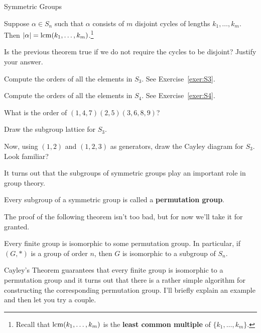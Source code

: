 \begin{section}{Symmetric Groups}
\begin{theorem}
Suppose $\alpha\in S_n$ such that $\alpha$ consists of $m$ disjoint cycles of lengths $k_1,\ldots, k_m$.  Then $|\alpha|=\operatorname{lcm}(k_1,\ldots, k_m)$.\footnote{Recall that $\operatorname{lcm}(k_1,\ldots, k_m)$ is the \textbf{least common multiple} of $\{k_1,\ldots, k_m\}$.} 
\end{theorem}

\begin{problem}
Is the previous theorem true if we do not require the cycles to be disjoint?  Justify your answer.
\end{problem}

\begin{exercise}
Compute the orders of all the elements in $S_3$.  See Exercise~\ref{exer:S3}.
\end{exercise}

\begin{exercise}
Compute the orders of all the elements in $S_4$.  See Exercise~\ref{exer:S4}.
\end{exercise}

\begin{exercise}
What is the order of $(1,4,7)(2,5)(3,6,8,9)$?
\end{exercise}

\begin{exercise}
Draw the subgroup lattice for $S_3$.
\end{exercise}

\begin{exercise}
Now, using $(1,2)$ and $(1,2,3)$ as generators, draw the Cayley diagram for $S_3$.  Look familiar?
\end{exercise}

It turns out that the subgroups of symmetric groups play an important role in group theory.

\begin{definition}
Every subgroup of a symmetric group is called a \textbf{permutation group}.
\end{definition}

The proof of the following theorem isn't too bad, but for now we'll take it for granted.

\begin{theorem}
Every finite group is isomorphic to some permutation group.  In particular, if $(G,*)$ is a group of order $n$, then $G$ is isomorphic to a subgroup of $S_n$.
\end{theorem}

Cayley's Theorem guarantees that every finite group is isomorphic to a permutation group and it turns out that there is a rather simple algorithm for constructing the corresponding permutation group.  I'll briefly explain an example and then let you try a couple.


\end{section}
